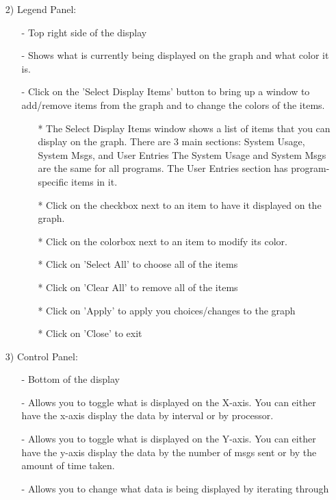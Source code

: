 \documentclass[10pt,dvips]{article}
\begin{document}
\begin{enumerate}
   \item[2)]
   Legend Panel:
      \begin{itemize}
      \item[-]
        Top right side of the display
      \item[-]
        Shows what is currently being displayed on the graph and what color it
        is.
      \item[-]
        Click on the 'Select Display Items' button to bring up a window to
        add/remove items from the graph and to change the colors of the items.
        \begin{itemize}
	\item[*]
          The Select Display Items window shows a list of items that you can
          display on the graph.  There are 3 main sections:
            System Usage, System Msgs, and User Entries
          The System Usage and System Msgs are the same for all programs.  The
          User Entries section has program-specific items in it.
	\item[*]
          Click on the checkbox next to an item to have it displayed on the
          graph.
	\item[*]
          Click on the colorbox next to an item to modify its color.
	\item[*]
          Click on 'Select All' to choose all of the items
	\item[*]
          Click on 'Clear All' to remove all of the items
	\item[*]
          Click on 'Apply' to apply you choices/changes to the graph
	\item[*]
          Click on 'Close' to exit
	\end{itemize}
      \end{itemize}
   \item[3)]
   Control Panel:
      \begin{itemize}
      \item[-]
        Bottom of the display
      \item[-]
        Allows you to toggle what is displayed on the X-axis.  You can either
        have the x-axis display the data by interval or by processor.
      \item[-]
        Allows you to toggle what is displayed on the Y-axis.  You can either
        have the y-axis display the data by the number of msgs sent or
        by the amount of time taken.
      \item[-]
        Allows you to change what data is being displayed by iterating through

\end{itemize}
\end{enumerate}
\end{document}
